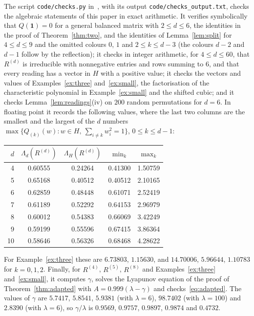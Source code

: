 \documentclass[11pt]{amsart}
\theoremstyle{definition}
\theoremstyle{remark}
\newcommand{\one}{\mathbf 1}
\begin{document}
The script \texttt{code/checks.py} in~\cite{code}, with its output \texttt{code/checks\_output.txt}, checks the algebraic statements of this paper in exact arithmetic. It verifies symbolically that $Q(\one)=0$ for a general balanced matrix with $2\le d\le6$, the identities in the proof of Theorem~\ref{thm:two}, and the identities of Lemma~\ref{lem:split} for $4\le d\le 9$ and the omitted colours $0$, $1$ and $2\le k\le d-3$ (the colours $d-2$ and $d-1$ follow by the reflection); it checks in integer arithmetic, for $4\le d\le60$, that $R^{(d)}$ is irreducible with nonnegative entries and rows summing to $6$, and that every reading has a vector in $H$ with a positive value; it checks the vectors and values of Examples~\ref{ex:three} and~\ref{ex:small}, the factorisation of the characteristic polynomial in Example~\ref{ex:small} and the shifted cubic; and it checks Lemma~\ref{lem:readings}(iv) on $200$ random permutations for $d=6$. In floating point it records the following values, where the last two columns are the smallest and the largest of the $d$ numbers $\max\{Q_{(k)}(w):w\in H,\ \sum_{i\ne k}w_i^2=1\}$, $0\le k\le d-1$:
\begin{center}
\renewcommand{\arraystretch}{1.1}
\begin{tabular}{rcccc}
$d$ & $\Lambda_d(R^{(d)})$ & $\Lambda_H(R^{(d)})$ & $\min_k$ & $\max_k$\\ \hline
4 & 0.60555 & 0.24264 & 0.41300 & 1.50759\\
5 & 0.65168 & 0.40512 & 0.40512 & 2.10165\\
6 & 0.62859 & 0.48448 & 0.61071 & 2.52419\\
7 & 0.61189 & 0.52292 & 0.64153 & 2.96979\\
8 & 0.60012 & 0.54383 & 0.66069 & 3.42249\\
9 & 0.59199 & 0.55596 & 0.67415 & 3.86364\\
10 & 0.58646 & 0.56326 & 0.68468 & 4.28622
\end{tabular}
\end{center}
For Example~\ref{ex:three} these are $6.73803$, $1.15630$, and $14.70006$, $5.96644$, $1.10783$ for $k=0,1,2$. Finally, for $R^{(4)}$, $R^{(5)}$, $R^{(8)}$ and Examples~\ref{ex:three} and~\ref{ex:small}, it computes $\gamma$, solves the Lyapunov equation of the proof of Theorem~\ref{thm:adapted} with $A=0.999(\lambda-\gamma)$ and checks~\eqref{eq:adapted}. The values of $\gamma$ are $5.7417$, $5.8541$, $5.9381$ (with $\lambda=6$), $98.7402$ (with $\lambda=100$) and $2.8390$ (with $\lambda=6$), so $\gamma/\lambda$ is $0.9569$, $0.9757$, $0.9897$, $0.9874$ and $0.4732$.
\end{document}
